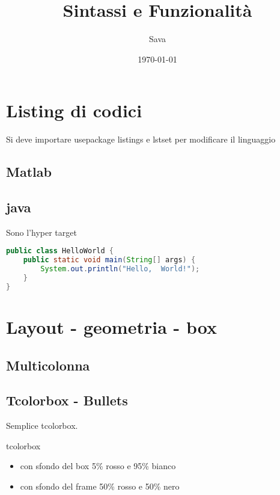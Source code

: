 \documentclass[12pt, a4paper]{article}
\title{Sintassi e Funzionalità}
\author{Sava}
\date{\today}
\begin{document}
	\maketitle
	\tableofcontents
	
	
	
	\newpage	
	\section{Listing di codici}
	Si deve importare usepackage {listings}
	e lstset{} per modificare il linguaggio
	\subsection{Matlab}
	
	\subsection{java}
	\hypertarget{Sava target}{Sono l'hyper target}
	\begin{lstlisting}[language=Java]
public class HelloWorld {
	public static void main(String[] args) {
		System.out.println("Hello,  World!");
	}
}
	\end{lstlisting}	
	
	
	
	\newpage
	\section{Layout - geometria - box}
	\subsection{Multicolonna}	
	
	
	\subsection{Tcolorbox - Bullets}
	\begin{tcolorbox}
		Semplice tcolorbox.
	\end{tcolorbox}
	\begin{tcolorbox}[colback=red!5!white,colframe=red!50!black,title=Tcolorbox speciale]
		tcolorbox
		\begin{itemize}[noitemsep,topsep=0pt]
			\item con sfondo del box 5\% rosso e 95\% bianco
			\item con sfondo del frame 50\% rosso e 50\% nero
		\end{itemize}
	\end{tcolorbox}
	
\end{document}
